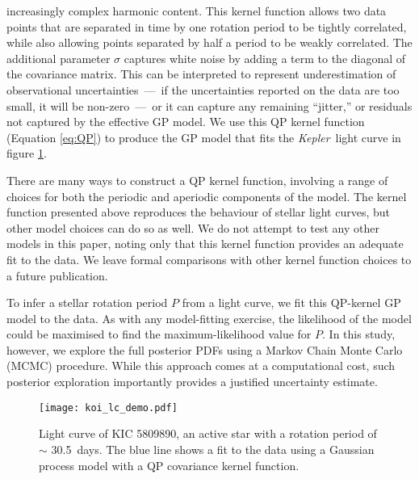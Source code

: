 \documentclass[a4paper,fleqn,usenatbib,useAMS]{mnras}
\newcommand{\Kepler}{{\it Kepler}}
\newcommand{\kepexample}{5809890}
\newcommand{\kepexampleperiod}{30.5}
\begin{document}
increasingly complex harmonic content.
This kernel function allows two data points that are separated in time by one
rotation period to be tightly correlated, while also allowing
points separated by half a period to be weakly correlated.
The additional parameter $\sigma$ captures white noise by adding
a term to the diagonal of the covariance matrix.
This can be interpreted to represent underestimation of observational
uncertainties~---~if the uncertainties reported on the data are too small, it
will be non-zero~---~or it can capture any remaining ``jitter,'' or residuals
not captured by the effective GP model.
We use this QP kernel function (Equation \ref{eq:QP}) to produce
the GP model that fits the \Kepler\ light curve in figure
\ref{fig:GP_example}.

There are many ways to construct a QP kernel function, involving a range of
choices for both the periodic and aperiodic components of the model.
The kernel function presented above reproduces the behaviour of stellar light
curves, but other model choices can do so as well.
We do not attempt to test any other models in this paper, noting only that
this kernel function provides an adequate fit to the data.
We leave formal comparisons with other kernel function choices to a future
publication.

To infer a stellar rotation period $P$ from a light curve, we fit this
QP-kernel GP model to the data.  As with any model-fitting exercise, the
likelihood
of the model could be maximised to find the maximum-likelihood value for $P$.
In this study, however, we explore the full posterior PDFs using a Markov
Chain Monte Carlo (MCMC) procedure.  While
this approach comes at a computational cost, such posterior exploration
importantly provides a justified uncertainty estimate.

\begin{figure}
\begin{center}
\texttt{[image: koi\_lc\_demo.pdf]}
\caption[A light curve with a GP model.]
{Light curve of KIC \kepexample, an active star with a rotation period of
$\sim$ \kepexampleperiod\ days.
The blue line shows a fit to the data using a Gaussian process model with a QP
covariance kernel function.}
\label{fig:GP_example}
\end{center}
\end{figure}
\end{document}
